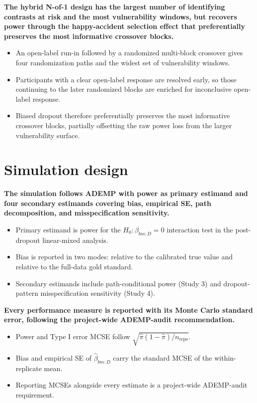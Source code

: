 \documentclass[
  11pt,
]{article}
\begin{document}
\textbf{The hybrid N-of-1 design has the largest number of identifying contrasts at risk and the most vulnerability windows, but recovers power through the happy-accident selection effect that preferentially preserves the most informative crossover blocks.}

\begin{itemize}\setlength{\itemsep}{2pt}\setlength{\parskip}{0pt}
\item An open-label run-in followed by a randomized multi-block crossover gives four randomization paths and the widest set of vulnerability windows.
\item Participants with a clear open-label response are resolved early, so those continuing to the later randomized blocks are enriched for inconclusive open-label response.
\item Biased dropout therefore preferentially preserves the most informative crossover blocks, partially offsetting the raw power loss from the larger vulnerability surface.
\end{itemize}

\section{Simulation design}\label{simulation-design}

\textbf{The simulation follows ADEMP with power as primary estimand and four secondary estimands covering bias, empirical SE, path decomposition, and misspecification sensitivity.}

\begin{itemize}\setlength{\itemsep}{2pt}\setlength{\parskip}{0pt}
\item Primary estimand is power for the $H_0: \beta_{bm:D}=0$ interaction test in the post-dropout linear-mixed analysis.
\item Bias is reported in two modes: relative to the calibrated true value and relative to the full-data gold standard.
\item Secondary estimands include path-conditional power (Study 3) and dropout-pattern misspecification sensitivity (Study 4).
\end{itemize}

\textbf{Every performance measure is reported with its Monte Carlo standard error, following the project-wide ADEMP-audit recommendation.}

\begin{itemize}\setlength{\itemsep}{2pt}\setlength{\parskip}{0pt}
\item Power and Type I error MCSE follow $\sqrt{\hat{\pi}(1-\hat{\pi})/n_{\text{reps}}}$.
\item Bias and empirical SE of $\hat{\beta}_{bm:D}$ carry the standard MCSE of the within-replicate mean.
\item Reporting MCSEs alongside every estimate is a project-wide ADEMP-audit requirement.
\end{itemize}
\end{document}
